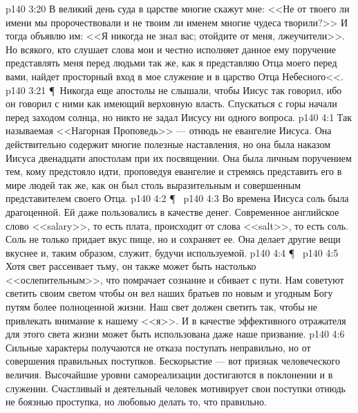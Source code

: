 \vs p140 3:20 В великий день суда в царстве многие скажут мне: <<Не от твоего ли имени мы пророчествовали и не твоим ли именем многие чудеса творили?>> И тогда объявлю им: <<Я никогда не знал вас; отойдите от меня, лжеучители>>. Но всякого, кто слушает слова мои и честно исполняет данное ему поручение представлять меня перед людьми так же, как я представляю Отца моего перед вами, найдет просторный вход в мое служение и в царство Отца Небесного<<.
\vs p140 3:21 \P\ Никогда еще апостолы не слышали, чтобы Иисус так говорил, ибо он говорил с ними как имеющий верховную власть. Спускаться с горы начали перед заходом солнца, но никто не задал Иисусу ни одного вопроса.
\vs p140 4:1 Так называемая <<Нагорная Проповедь>> --- отнюдь не евангелие Иисуса. Она действительно содержит многие полезные наставления, но она была наказом Иисуса двенадцати апостолам при их посвящении. Она была личным поручением тем, кому предстояло идти, проповедуя евангелие и стремясь представить его в мире людей так же, как он был столь выразительным и совершенным представителем своего Отца.
\vs p140 4:2 \P\ 
\vs p140 4:3 Во времена Иисуса соль была драгоценной. Ей даже пользовались в качестве денег. Современное английское слово <<salary>>, то есть плата, происходит от слова <<salt>>, то есть соль. Соль не только придает вкус пище, но и сохраняет ее. Она делает другие вещи вкуснее и, таким образом, служит, будучи используемой.
\vs p140 4:4 \P\ 
\vs p140 4:5 Хотя свет рассеивает тьму, он также может быть настолько <<ослепительным>>, что помрачает сознание и сбивает с пути. Нам советуют светить своим светом  чтобы он вел наших братьев по новым и угодным Богу путям более полноценной жизни. Наш свет должен светить так, чтобы не привлекать внимание к нашему <<я>>. И в качестве эффективного отражателя для этого света жизни может быть использована даже наше призвание.
\vs p140 4:6 Сильные характеры получаются не  отказа поступать неправильно, но от совершения правильных поступков. Бескорыстие --- вот признак человеческого величия. Высочайшие уровни самореализации достигаются в поклонении и в служении. Счастливый и деятельный человек мотивирует свои поступки отнюдь не боязнью проступка, но любовью делать то, что правильно.
